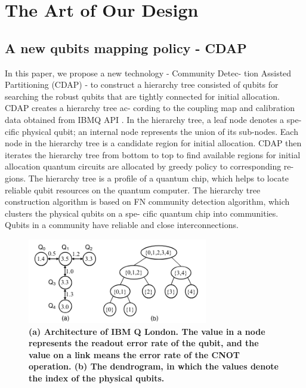 \documentclass{article}
\begin{document}
	\section{The Art of Our Design}
	
	\subsection{A new qubits mapping policy - CDAP}
	In this paper, we propose a new technology - Community Detec-
	tion Assisted Partitioning (CDAP) - to construct a hierarchy tree
	consisted of qubits for searching the robust qubits that are tightly
	connected for initial allocation. CDAP creates a hierarchy tree ac-
	cording to the coupling map and calibration data obtained from
	IBMQ API \cite{ibm2020quantum}. In the hierarchy tree, a leaf node denotes a spe-
	cific physical qubit; an internal node represents the union of its
	sub-nodes. Each node in the hierarchy tree is a candidate region
	for initial allocation. CDAP then iterates the hierarchy tree from
	bottom to top to find available regions for initial allocation
	quantum circuits are allocated by greedy policy to corresponding re-
	gions. The hierarchy tree is a profile of a quantum chip, which helps
	to locate reliable qubit resources on the quantum computer. The
	hierarchy tree construction algorithm is based on FN community
	detection algorithm, which clusters the physical qubits on a spe-
	cific quantum chip into communities. Qubits in a community have
	reliable and close interconnections.
	\begin{figure}[H]
		\centering
		\includegraphics[width=0.7\textwidth]{figure_1.png}
		\caption[Bold]{\textbf{(a) Architecture of IBM Q London. The value in a
				node represents the readout error rate of the qubit, and the
				value on a link means the error rate of the CNOT operation.
				(b) The dendrogram, in which the values denote the index of
				the physical qubits.}}
		\label{fig:image1}
	\end{figure}
	
	
	
\end{document}
